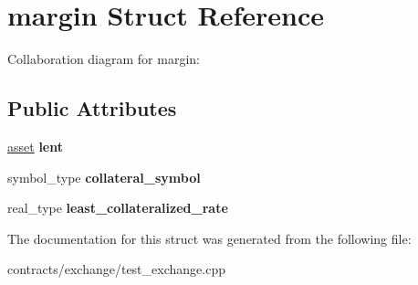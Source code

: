\hypertarget{structmargin}{}\section{margin Struct Reference}
\label{structmargin}


Collaboration diagram for margin\+:
\subsection*{Public Attributes}
\begin{DoxyCompactItemize}
\item 
\mbox{\label{structmargin_acf736bace17219c22d899f37afeb01e8}} 
\mbox{\hyperlink{structasset}{asset}} {\bfseries lent}
\item 
\mbox{\label{structmargin_aeb22afc16e8240f1ca477f9d5fc67458}} 
symbol\+\_\+type {\bfseries collateral\+\_\+symbol}
\item 
\mbox{\label{structmargin_ac00146adbcd1a3f758dcf363cf09393c}} 
real\+\_\+type {\bfseries least\+\_\+collateralized\+\_\+rate}
\end{DoxyCompactItemize}


The documentation for this struct was generated from the following file\+:\begin{DoxyCompactItemize}
\item 
contracts/exchange/test\+\_\+exchange.\+cpp\end{DoxyCompactItemize}
